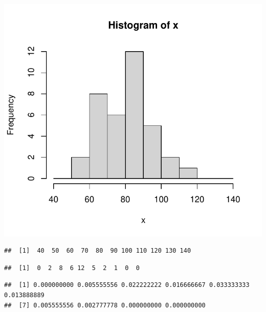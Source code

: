 \documentclass[
]{article}
\newenvironment{Shaded}{\begin{snugshade}}{\end{snugshade}}
\newcommand{\NormalTok}[1]{#1}
\newcommand{\SpecialCharTok}[1]{\textcolor[rgb]{0.00,0.00,0.00}{#1}}
\begin{document}
\includegraphics{DistNormal_files/figure-latex/unnamed-chunk-15-1.pdf}

\begin{Shaded}
\end{Shaded}

\begin{verbatim}
##  [1]  40  50  60  70  80  90 100 110 120 130 140
\end{verbatim}

\begin{Shaded}
\end{Shaded}

\begin{verbatim}
##  [1]  0  2  8  6 12  5  2  1  0  0
\end{verbatim}

\begin{Shaded}
\end{Shaded}

\begin{verbatim}
##  [1] 0.000000000 0.005555556 0.022222222 0.016666667 0.033333333 0.013888889
##  [7] 0.005555556 0.002777778 0.000000000 0.000000000
\end{verbatim}
\end{document}
